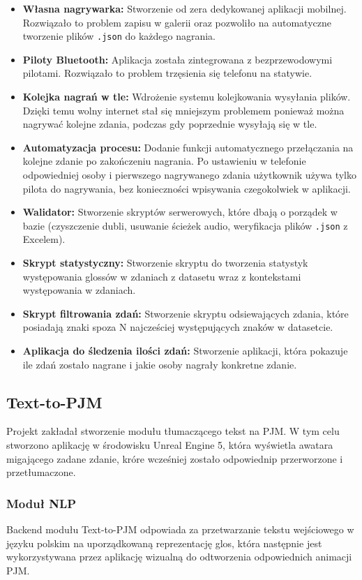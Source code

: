 \documentclass[12pt]{article}
\begin{document}
\begin{itemize}
    \item \textbf{Własna nagrywarka:} Stworzenie od zera dedykowanej aplikacji mobilnej. Rozwiązało to problem zapisu w galerii oraz pozwoliło na automatyczne tworzenie plików \texttt{.json} do każdego nagrania.
    \item \textbf{Piloty Bluetooth:} Aplikacja została zintegrowana z bezprzewodowymi pilotami. Rozwiązało to problem trzęsienia się telefonu na statywie.
    \item \textbf{Kolejka nagrań w tle:} Wdrożenie systemu kolejkowania wysyłania plików. Dzięki temu wolny internet stał się mniejszym problemem ponieważ można nagrywać kolejne zdania, podczas gdy poprzednie wysyłają się w tle.
    \item \textbf{Automatyzacja procesu:} Dodanie funkcji automatycznego przełączania na kolejne zdanie po zakończeniu nagrania. Po ustawieniu w telefonie odpowiedniej osoby i pierwszego nagrywanego zdania użytkownik używa tylko pilota do nagrywania, bez konieczności wpisywania czegokolwiek w aplikacji.
    \item \textbf{Walidator:} Stworzenie skryptów serwerowych, które dbają o porządek w bazie (czyszczenie dubli, usuwanie ścieżek audio, weryfikacja plików \texttt{.json} z Excelem).
    \item \textbf{Skrypt statystyczny:} Stworzenie skryptu do tworzenia statystyk występowania glossów w zdaniach z datasetu wraz z kontekstami występowania w zdaniach.
    \item \textbf{Skrypt filtrowania zdań:} Stworzenie skryptu odsiewających zdania, które posiadają znaki spoza N najcześciej występujących znaków w datasetcie.
    \item \textbf{Aplikacja do śledzenia ilości zdań:} Stworzenie aplikacji, która pokazuje ile zdań zostało nagrane i jakie osoby nagrały konkretne zdanie.
\end{itemize}

\subsection{Text-to-PJM}

Projekt zakładał stworzenie modułu tłumaczącego tekst na PJM. W tym celu stworzono aplikację w środowisku Unreal Engine 5, która wyświetla awatara migającego zadane zdanie, króre wcześniej zostało odpowiednip przerworzone i przetłumaczone. 

\subsubsection{Moduł NLP}
Backend modułu Text-to-PJM odpowiada za przetwarzanie tekstu wejściowego w języku polskim na uporządkowaną reprezentację glos, która następnie jest wykorzystywana przez aplikację wizualną do odtworzenia odpowiednich animacji PJM.
\end{document}
